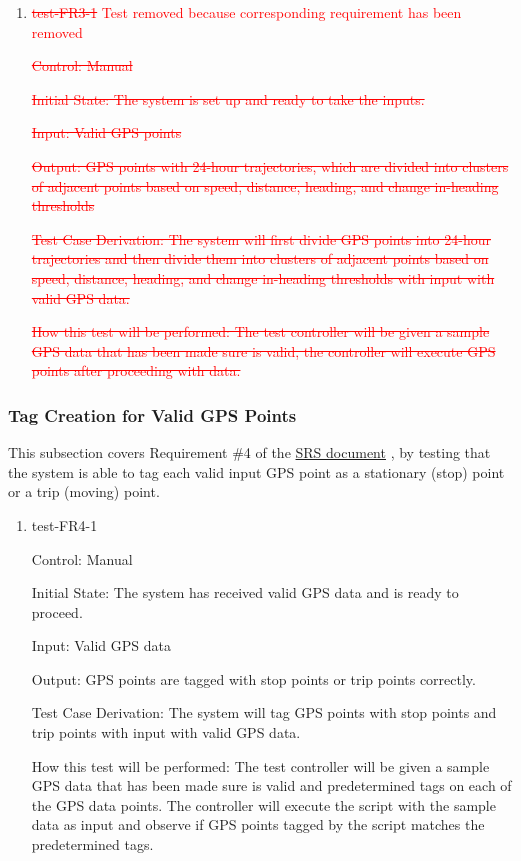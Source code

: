 \documentclass[12pt, titlepage]{article}
\begin{document}
\begin{enumerate}

\item{\textcolor{red}{\sout{test-FR3-1} Test removed because corresponding requirement has been removed}} \label{test-FR3-1}

\textcolor{red}{\sout{Control: Manual}}
				
\textcolor{red}{\sout{Initial State: The system is set up and ready to take the inputs.}}
					
\textcolor{red}{\sout{Input: Valid GPS points}}
					
\textcolor{red}{\sout{Output: GPS points with 24-hour trajectories, which are divided into clusters of
adjacent points based on speed, distance, heading, and change in-heading thresholds}}

\textcolor{red}{\sout{Test Case Derivation: The system will first divide GPS points into 24-hour trajectories and then divide them into clusters of adjacent points based on speed, distance, heading, and change in-heading thresholds with input with valid GPS data.}}
					
\textcolor{red}{\sout{How this test will be performed: The test controller will be given a sample GPS data that has been made sure is valid, the controller will execute GPS points after proceeding with data.}}

\end{enumerate}

\subsubsection{Tag Creation for Valid GPS Points}

This subsection covers Requirement \#4 of the \href{https://github.com/paezha/PyERT-BLACK/blob/main/docs/SRS/SRS.pdf}{SRS document} \citep{SRS}, by testing that the system is able to tag each valid input GPS point as a stationary (stop) point or a trip (moving) point.

\begin{enumerate}

\item{test-FR4-1\\} \label{test-FR4-1}

Control: Manual 
					
Initial State: The system has received valid GPS data and is ready to proceed. 
					
Input: Valid GPS data
					
Output: GPS points are tagged with stop points or trip points correctly.

Test Case Derivation: The system will tag GPS points with stop points and trip points with input with valid GPS data.
					
How this test will be performed: The test controller will be given a sample GPS data that has been made sure is valid and predetermined tags on each of the GPS data points. The controller will execute the script with the sample data as input and observe if GPS points tagged by the script matches the predetermined tags.

\end{enumerate}
\end{document}
